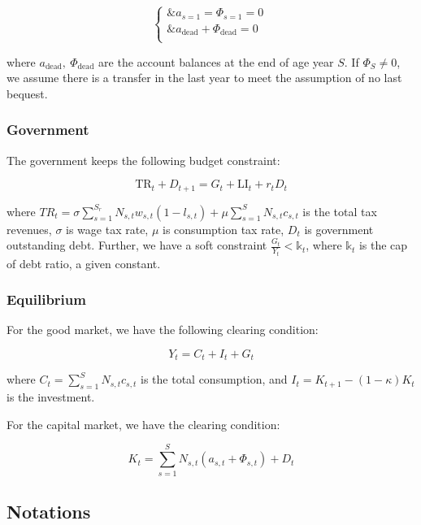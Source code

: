 \[\left\{ \begin{matrix}
\& a_{s = 1} = \Phi_{s = 1} = 0 \\
\& a_{\text{dead}} + \Phi_{\text{dead}} = 0 \\
\end{matrix} \right.\ \]

where \(a_{\text{dead}},\ \Phi_{\text{dead}}\) are the account balances
at the end of age year \(S\). If \(\Phi_{S} \neq 0\), we assume there is
a transfer in the last year to meet the assumption of no last bequest.

\hypertarget{government}{%
\subsubsection{Government}\label{government}}

The government keeps the following budget constraint:

\[\text{TR}_{t} + D_{t + 1} = G_{t} + \text{LI}_{t} + r_{t}D_{t}\]

where
\(TR_{t} = \sigma\sum_{s = 1}^{S_{r}}{N_{s,t}w_{s,t}\left( 1 - l_{s,t} \right)} + \mu\sum_{s = 1}^{S}{N_{s,t}c_{s,t}}\)
is the total tax revenues, \(\sigma\) is wage tax rate, \(\mu\) is
consumption tax rate, \(D_{t}\) is government outstanding debt. Further,
we have a soft constraint \(\frac{G_{t}}{Y_{t}} < \mathbb{k}_{t}\),
where \(\mathbb{k}_{t}\) is the cap of debt ratio, a given constant.

\hypertarget{equilibrium}{%
\subsubsection{Equilibrium}\label{equilibrium}}

For the good market, we have the following clearing condition:

\[Y_{t} = C_{t} + I_{t} + G_{t}\]

where \(C_{t} = \sum_{s = 1}^{S}{N_{s,t}c_{s,t}}\) is the total
consumption, and \(I_{t} = K_{t + 1} - \left( 1 - \kappa \right)K_{t}\)
is the investment.

For the capital market, we have the clearing condition:

\[K_{t} = \sum_{s = 1}^{S}{N_{s,t}\left( a_{s,t} + \Phi_{s,t} \right)} + D_{t}\]

\hypertarget{notations}{%
\subsection{Notations}\label{notations}}

